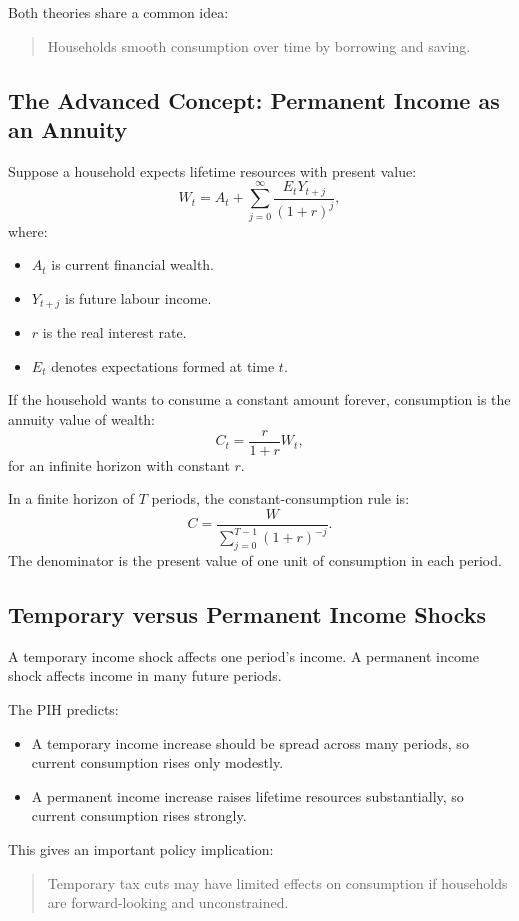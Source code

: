\documentclass[12pt,a4paper]{article}
\begin{document}
Both theories share a common idea:
\begin{quote}
Households smooth consumption over time by borrowing and saving.
\end{quote}

\subsection*{The Advanced Concept: Permanent Income as an Annuity}
Suppose a household expects lifetime resources with present value:
\[ W_t = A_t + \sum_{j=0}^{\infty} \frac{E_t Y_{t+j}}{(1+r)^j}, \]
where:
\begin{itemize}
    \item $A_t$ is current financial wealth.
    \item $Y_{t+j}$ is future labour income.
    \item $r$ is the real interest rate.
    \item $E_t$ denotes expectations formed at time $t$.
\end{itemize}

If the household wants to consume a constant amount forever, consumption is the annuity value of wealth:
\[ C_t = \frac{r}{1+r} W_t, \]
for an infinite horizon with constant $r$.

In a finite horizon of $T$ periods, the constant-consumption rule is:
\[ C = \frac{W}{\sum_{j=0}^{T-1} (1+r)^{-j}}. \]
The denominator is the present value of one unit of consumption in each period.

\subsection*{Temporary versus Permanent Income Shocks}
A temporary income shock affects one period's income. A permanent income shock affects income in many future periods.

The PIH predicts:
\begin{itemize}
    \item A temporary income increase should be spread across many periods, so current consumption rises only modestly.
    \item A permanent income increase raises lifetime resources substantially, so current consumption rises strongly.
\end{itemize}

This gives an important policy implication:
\begin{quote}
Temporary tax cuts may have limited effects on consumption if households are forward-looking and unconstrained.
\end{quote}
\end{document}
